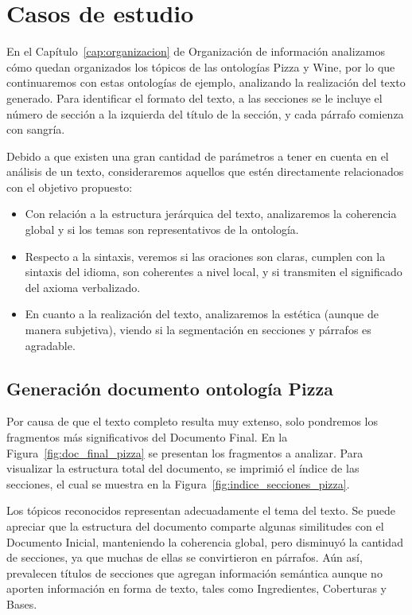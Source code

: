 \section{Casos de estudio}
En el Capítulo~\ref{cap:organizacion} de Organización de información analizamos cómo quedan organizados los tópicos de las ontologías Pizza y Wine, por lo que continuaremos con estas ontologías de ejemplo, analizando la realización del texto generado. Para identificar el formato del texto, a las secciones se le incluye el número de sección a la izquierda del título de la sección, y cada párrafo comienza con sangría.

Debido a que existen una gran cantidad de  parámetros a tener en cuenta en el análisis de un texto, consideraremos aquellos que estén directamente relacionados con el objetivo propuesto: 

\begin{itemize}
    \item Con relación a la estructura jerárquica del texto, analizaremos la coherencia global y si los temas son representativos de la ontología.
    \item Respecto a la sintaxis, veremos si las oraciones son claras, cumplen con la sintaxis del idioma, son coherentes a nivel local, y si transmiten el significado del axioma verbalizado. 
    \item En cuanto a la realización del texto, analizaremos la estética (aunque de manera subjetiva), viendo si la segmentación en secciones y párrafos es agradable.
\end{itemize}


\subsection{Generación documento ontología Pizza}
Por causa de que el texto completo resulta muy extenso, solo pondremos los fragmentos más significativos del Documento Final. En la Figura~\ref{fig:doc_final_pizza} se presentan los fragmentos a analizar. Para visualizar la estructura total del documento, se imprimió el índice de las secciones, el cual se muestra en la Figura~\ref{fig:indice_secciones_pizza}. 

Los tópicos reconocidos representan adecuadamente el tema del texto. Se puede apreciar que la estructura del documento comparte algunas similitudes con el Documento Inicial, manteniendo la coherencia global, pero disminuyó la cantidad de secciones, ya que muchas de ellas se convirtieron en párrafos. Aún así, prevalecen títulos de secciones que agregan información semántica aunque no aporten información en forma de texto, tales como Ingredientes, Coberturas y Bases.

